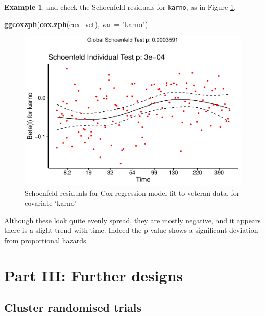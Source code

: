 \documentclass[
  openany]{book}
\newenvironment{Shaded}{\begin{snugshade}}{\end{snugshade}}
\newcommand{\AttributeTok}[1]{\textcolor[rgb]{0.13,0.29,0.53}{#1}}
\newcommand{\FunctionTok}[1]{\textcolor[rgb]{0.13,0.29,0.53}{\textbf{#1}}}
\newcommand{\NormalTok}[1]{#1}
\newcommand{\StringTok}[1]{\textcolor[rgb]{0.31,0.60,0.02}{#1}}
\theoremstyle{definition}
\theoremstyle{definition}
\newtheorem{example}{Example}[chapter]
\theoremstyle{definition}
\theoremstyle{definition}
\theoremstyle{remark}
\begin{document}
\begin{example}
and check the Schoenfeld residuals for \texttt{karno}, as in Figure \ref{fig:vetschoen}.

\begin{Shaded}
\begin{Highlighting}[]
\FunctionTok{ggcoxzph}\NormalTok{(}\FunctionTok{cox.zph}\NormalTok{(cox\_vet), }\AttributeTok{var =} \StringTok{"karno"}\NormalTok{)}
\end{Highlighting}
\end{Shaded}

\begin{figure}
\centering
\includegraphics{CT4H_notes_files/figure-latex/vetschoen-1.pdf}
\caption{\label{fig:vetschoen}Schoenfeld residuals for Cox regression model fit to veteran data, for covariate `karno'}
\end{figure}

Although these look quite evenly spread, they are mostly negative, and it appears there is a slight trend with time. Indeed the p-value shows a significant deviation from proportional hazards.
\end{example}

\part{Part III: Further designs}\label{part-part-iii-further-designs}

\chapter{Cluster randomised trials}\label{cluster-rct}
\end{document}
